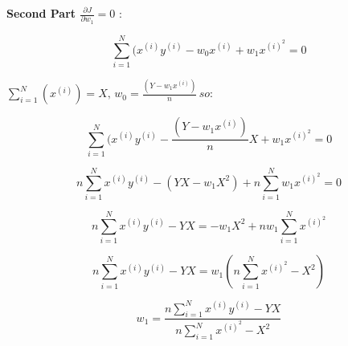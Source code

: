 \documentclass{article}
\newenvironment{cheatformula}[1][כותרת]{
    \begin{minipage}{\linewidth}
    \textbf{#1}:
}{
    \end{minipage}\\[0ex]
}
\begin{document}
\begin{multicols*}{2}
\begin{cheatformula}[Second Part $\frac{\partial J}{\partial w_{1}} = 0$ ]
\begin{equation}
\sum_{i=1}^{N} (x^{(i)}y^{(i)} - w_{0}x^{(i)} + w_{1}x^{(i)^{2}} = 0
\end{equation}

$ \sum_{i=1}^{N} (x^{(i)})=X   ,\,  w_{0} = \frac{(Y -w_{1}x^{(i)})}{n} \, so: $

\begin{equation}
\sum_{i=1}^{N} (x^{(i)}y^{(i)} - \frac{(Y -w_{1}x^{(i)})}{n} X  + w_{1}x^{(i)^{2}} = 0
\end{equation}

\begin{equation}
n \sum_{i=1}^{N} x^{(i)}y^{(i)} - {(YX -w_{1}X^{2})}   + n\sum_{i=1}^{N}w_{1}x^{(i)^{2}} = 0
\end{equation}

\begin{equation}
n \sum_{i=1}^{N} x^{(i)}y^{(i)} - YX=  - w_{1}X^{2}   + n w_{1}\sum_{i=1}^{N}x^{(i)^{2}}
\end{equation}

\begin{equation}
n \sum_{i=1}^{N} x^{(i)}y^{(i)} - YX = w_{1} (n \sum_{i=1}^{N}x^{(i)^{2}} - X^{2})
\end{equation}

\begin{equation}
w_{1} = \frac{n \sum_{i=1}^{N} x^{(i)}y^{(i)} - YX}{n \sum_{i=1}^{N}x^{(i)^{2}} - X^{2}}
\end{equation}

 
\end{cheatformula}
\pagebreak




\end{multicols*}
\newpage
\end{document}
